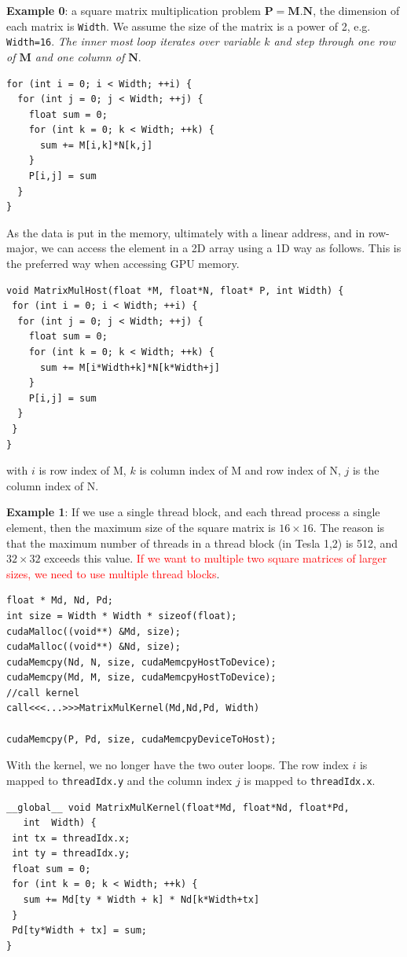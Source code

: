 {\bf Example 0}: a square matrix multiplication problem
$\mathbf{P=M.N}$, the dimension of each matrix is \verb!Width!. We
assume the size of the matrix is a power of 2, e.g. \verb!Width=16!.
{\it The inner most loop iterates over variable $k$ and step through
  one row of $\mathbf{M}$ and one column of $\mathbf{N}$}. 
\begin{lstlisting}
for (int i = 0; i < Width; ++i) {
  for (int j = 0; j < Width; ++j) {
    float sum = 0;
    for (int k = 0; k < Width; ++k) {
      sum += M[i,k]*N[k,j]
    }
    P[i,j] = sum
  }
}
\end{lstlisting}
As the data is put in the memory, ultimately with a linear address,
and in row-major, we can access the element in a 2D array using a 1D
way as follows. This is the preferred way when accessing GPU memory.
\begin{lstlisting}
void MatrixMulHost(float *M, float*N, float* P, int Width) {
 for (int i = 0; i < Width; ++i) {
  for (int j = 0; j < Width; ++j) {
    float sum = 0;
    for (int k = 0; k < Width; ++k) {
      sum += M[i*Width+k]*N[k*Width+j]
    }
    P[i,j] = sum
  }
 }
}
\end{lstlisting}
with $i$ is row index of M, $k$ is column index of M and row index of
N, $j$ is the column index of N. 

{\bf Example 1}: If we use a single thread block, and each thread
process a single element, then the maximum size of the square matrix
is $16\times 16$. The reason is that the maximum number of threads in
a thread block (in Tesla 1,2) is 512, and $32\times 32$ exceeds this
value.
\textcolor{red}{If we want to multiple two square matrices of larger
  sizes, we need to use multiple thread blocks}.
\begin{lstlisting}
float * Md, Nd, Pd;
int size = Width * Width * sizeof(float);
cudaMalloc((void**) &Md, size);
cudaMalloc((void**) &Nd, size);
cudaMemcpy(Nd, N, size, cudaMemcpyHostToDevice);
cudaMemcpy(Md, M, size, cudaMemcpyHostToDevice);
//call kernel
call<<<...>>>MatrixMulKernel(Md,Nd,Pd, Width)

cudaMemcpy(P, Pd, size, cudaMemcpyDeviceToHost);
\end{lstlisting}
With the kernel, we no longer have the two outer loops. The row index
$i$ is mapped to \verb!threadIdx.y! and the column index $j$ is mapped
to \verb!threadIdx.x!.
\begin{lstlisting}
__global__ void MatrixMulKernel(float*Md, float*Nd, float*Pd, 
   int  Width) {
 int tx = threadIdx.x;
 int ty = threadIdx.y;
 float sum = 0;
 for (int k = 0; k < Width; ++k) {
   sum += Md[ty * Width + k] * Nd[k*Width+tx] 
 }
 Pd[ty*Width + tx] = sum;
}
\end{lstlisting}


